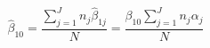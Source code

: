 \begin{equation}
\hat{\beta}_{10} = \frac{\sum\limits_{j=1}^J n_j\hat{\beta}_{1j}}{N} = \frac{\beta_{10}\sum\limits_{j=1}^J n_j \alpha_j}{N} 
\end{equation}